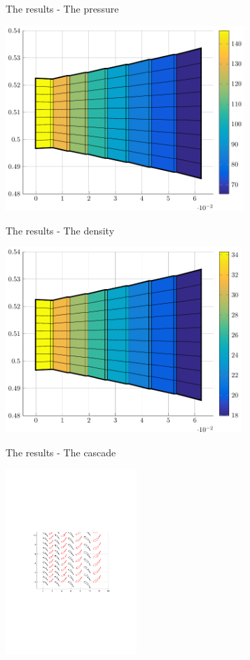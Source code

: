 \documentclass{beamer}
\newcommand{\myspaceneg}[0]{\vspace{-0.15cm}}
\begin{document}
\begin{frame}[t]{The results -  The pressure}

\myspaceneg
\myspaceneg
\begin{center}
 \includegraphics[height=7cm]{fig/machine_p.pdf}
 \end{center} 
\end{frame}

\begin{frame}[t]{The results -  The density}

\myspaceneg
\myspaceneg
\begin{center}
\includegraphics[height=7cm]{fig/machine_rho.pdf} 
\end{center}
\end{frame}


\begin{frame}[t]{The results -  The cascade}

\myspaceneg
\myspaceneg
\begin{center}
\includegraphics[height=7cm]{fig/blades.pdf} 
\end{center}
\end{frame}
\end{document}
